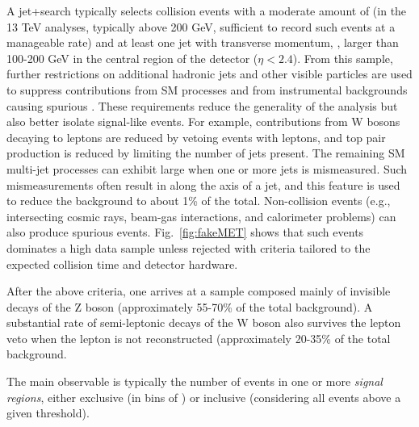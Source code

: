 A jet+\MET search typically selects collision events with a moderate amount of \MET (in the 13 TeV analyses, typically above 200 GeV, sufficient to record such events at a manageable rate) and at least one jet with transverse momentum, \pt, larger than 100-200 GeV in the central region of the detector ($\eta<2.4$). 
From this sample, further restrictions on additional hadronic jets and other visible particles are used to suppress contributions from SM processes and from instrumental backgrounds causing spurious \MET.
These requirements reduce the generality of the analysis but also better isolate signal-like events.
For example, contributions from W bosons decaying to leptons are reduced by vetoing events with leptons, and top pair production is reduced by limiting the number of jets present.
The remaining SM multi-jet processes can exhibit large \MET when one or more jets is mismeasured.
Such mismeasurements often result in \MET along the axis of a jet, and this feature is used to reduce the background to about 1\% of the total.
Non-collision events (e.g., intersecting cosmic rays, beam-gas interactions, and calorimeter problems) can also produce spurious \MET events.
Fig.~\ref{fig:fakeMET} shows that such events dominates a high \MET data sample unless rejected with criteria tailored to the expected collision time and detector hardware.%

After the above criteria, one arrives at a sample composed mainly of invisible decays of the Z boson (approximately 55-70\% of the total background).
A substantial rate of semi-leptonic decays of the W boson also survives the lepton veto when the lepton is not reconstructed (approximately 20-35\% of the total background.

The main observable is typically the number of events in one or more \MET \textit{signal regions}, either exclusive (in bins of \MET) or inclusive (considering all events above a given \MET threshold). 


